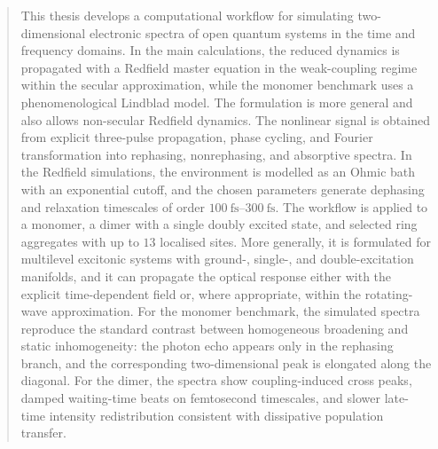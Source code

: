 \documentclass[
11pt, english, 
toctotoc, 		      %
]{style_thesis}
\author{Leopold \textsc{Bodamer}}
\begin{document}
\frontmatter
\pagestyle{plain}





\begin{abstract}
\addchaptertocentry{\abstractname}
This thesis develops a computational workflow for simulating two-dimensional electronic spectra of open quantum systems in the time and frequency domains. In the main calculations, the reduced dynamics is propagated with a Redfield master equation in the weak-coupling regime within the secular approximation, while the monomer benchmark uses a phenomenological Lindblad model. The formulation is more general and also allows non-secular Redfield dynamics. The nonlinear signal is obtained from explicit three-pulse propagation, phase cycling, and Fourier transformation into rephasing, nonrephasing, and absorptive spectra. In the Redfield simulations, the environment is modelled as an Ohmic bath with an exponential cutoff, and the chosen parameters generate dephasing and relaxation timescales of order \(\SIrange{100}{300}{\femto\second}\). The workflow is applied to a monomer, a dimer with a single doubly excited state, and selected ring aggregates with up to \(13\) localised sites. More generally, it is formulated for multilevel excitonic systems with ground-, single-, and double-excitation manifolds, and it can propagate the optical response either with the explicit time-dependent field or, where appropriate, within the rotating-wave approximation. For the monomer benchmark, the simulated spectra reproduce the standard contrast between homogeneous broadening and static inhomogeneity: the photon echo appears only in the rephasing branch, and the corresponding two-dimensional peak is elongated along the diagonal. For the dimer, the spectra show coupling-induced cross peaks, damped waiting-time beats on femtosecond timescales, and slower late-time intensity redistribution consistent with dissipative population transfer.
\end{abstract}

\mainmatter
\pagestyle{thesis}

%





%
%
\end{document}
